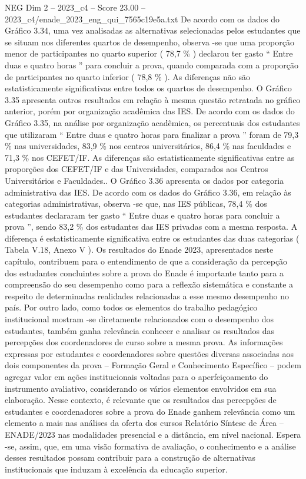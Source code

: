 \begin{textsample}{NEG Dim 2 – 2023\_c4 – Score 23.00 – 2023\_c4/enade\_2023\_eng\_qui\_7565c19e5a.txt}
De acordo com os dados do Gráfico 3.34, uma vez analisadas as alternativas selecionadas pelos estudantes que se situam nos diferentes quartos de desempenho, observa -se que uma proporção menor de participantes no quarto superior ( 78,7 \% ) declarou ter gasto “ Entre duas e quatro horas ” para concluir a prova, quando comparada com a proporção de participantes no quarto inferior ( 78,8 \% ).
As diferenças não são estatisticamente significativas entre todos os quartos de desempenho.
O Gráfico 3.35 apresenta outros resultados em relação à mesma questão retratada no gráfico anterior, porém por organização acadêmica das IES.
De acordo com os dados do Gráfico 3.35, na análise por organização acadêmica, os percentuais dos estudantes que utilizaram “ Entre duas e quatro horas para finalizar a prova ” foram de 79,3 \% nas universidades, 83,9 \% nos centros universitários, 86,4 \% nas faculdades e 71,3 \% nos CEFET/IF.
As diferenças são estatisticamente significativas entre as proporções dos CEFET/IF e das Universidades, comparados aos Centros Universitários e Faculdades..
O Gráfico 3.36 apresenta os dados por categoria administrativa das IES.
De acordo com os dados do Gráfico 3.36, em relação às categorias administrativas, observa -se que, nas IES públicas, 78,4 \% dos estudantes declararam ter gasto “ Entre duas e quatro horas para concluir a prova ”, sendo 83,2 \% dos estudantes das IES privadas com a mesma resposta.
A diferença é estatisticamente significativa entre os estudantes das duas categorias ( Tabela V.18, Anexo V ).
Os resultados do Enade 2023, apresentados neste capítulo, contribuem para o entendimento de que a consideração da percepção dos estudantes concluintes sobre a prova do Enade é importante tanto para a compreensão do seu desempenho como para a reflexão sistemática e constante a respeito de determinadas realidades relacionadas a esse mesmo desempenho no país.
Por outro lado, como todos os elementos do trabalho pedagógico institucional mostram -se diretamente relacionados com o desempenho dos estudantes, também ganha relevância conhecer e analisar os resultados das percepções dos coordenadores de curso sobre a mesma prova.
As informações expressas por estudantes e coordenadores sobre questões diversas associadas aos dois componentes da prova – Formação Geral e Conhecimento Específico – podem agregar valor em ações institucionais voltadas para o aperfeiçoamento do instrumento avaliativo, considerando os vários elementos envolvidos em sua elaboração.
Nesse contexto, é relevante que os resultados das percepções de estudantes e coordenadores sobre a prova do Enade ganhem relevância como um elemento a mais nas análises da oferta dos cursos Relatório Síntese de Área – ENADE/2023 nas modalidades presencial e a distância, em nível nacional.
Espera -se, assim, que, em uma visão formativa de avaliação, o conhecimento e a análise desses resultados possam contribuir para a construção de alternativas institucionais que induzam à excelência da educação superior.

\end{textsample}

